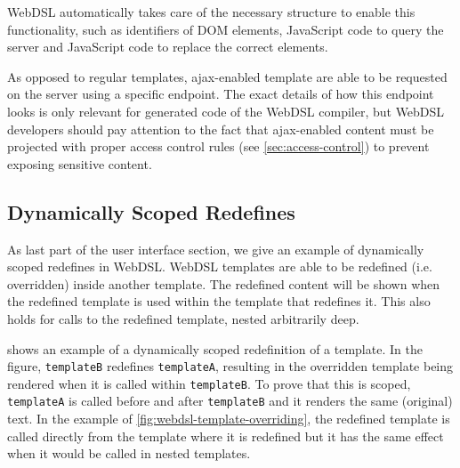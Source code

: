       WebDSL automatically takes care of the necessary structure to enable this functionality, such as identifiers of DOM elements, JavaScript code to query the server and JavaScript code to replace the correct elements.

      As opposed to regular templates, ajax-enabled template are able to be requested on the server using a specific endpoint. The exact details of how this endpoint looks is only relevant for generated code of the WebDSL compiler, but WebDSL developers should pay attention to the fact that ajax-enabled content must be projected with proper access control rules (see \cref{sec:access-control}) to prevent exposing sensitive content.

    \subsection{\label{subsec:redefines}Dynamically Scoped Redefines}

      As last part of the user interface section, we give an example of dynamically scoped redefines in WebDSL. WebDSL templates are able to be redefined (i.e. overridden) inside another template. The redefined content will be shown when the redefined template is used within the template that redefines it. This also holds for calls to the redefined template, nested arbitrarily deep.

       shows an example of a dynamically scoped redefinition of a template. In the figure, \texttt{templateB} redefines \texttt{templateA}, resulting in the overridden template being rendered when it is called within \texttt{templateB}. To prove that this is scoped, \texttt{templateA} is called before and after \texttt{templateB} and it renders the same (original) text. In the example of \cref{fig:webdsl-template-overriding}, the redefined template is called directly from the template where it is redefined but it has the same effect when it would be called in nested templates.


